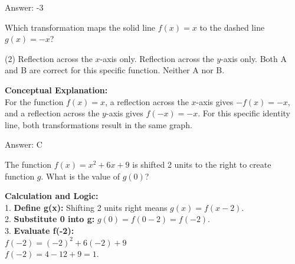 \documentclass[11pt,paper=a4,answers]{exam}
\begin{document}
\begin{questions}
\begin{solution}
\vspace{25pt}

Answer: \colorbox{yellow!100}{-3}
\end{solution}

\vspace{40pt}

\question
\begin{center}
\end{center}
Which transformation maps the solid line $f(x) = x$ to the dashed line $g(x) = -x$?
\begin{tasks}(2)
    \task Reflection across the $x$-axis only.
    \task Reflection across the $y$-axis only.
    \task Both A and B are correct for this specific function.
    \task Neither A nor B.
\end{tasks}

\begin{solution}
\textbf{Conceptual Explanation:} \\
For the function $f(x) = x$, a reflection across the $x$-axis gives $-f(x) = -x$, and a reflection across the $y$-axis gives $f(-x) = -x$. For this specific identity line, both transformations result in the same graph.

\vspace{25pt}

Answer: \colorbox{yellow!100}{C}
\end{solution}

\vspace{40pt}

\question
The function $f(x) = x^2 + 6x + 9$ is shifted 2 units to the right to create function $g$. What is the value of $g(0)$?

\begin{solution}
\textbf{Calculation and Logic:} \\
1. \textbf{Define g(x):} Shifting 2 units right means $g(x) = f(x-2)$. \\
2. \textbf{Substitute 0 into g:} $g(0) = f(0-2) = f(-2)$. \\
3. \textbf{Evaluate f(-2):} \\
$f(-2) = (-2)^2 + 6(-2) + 9$ \\
$f(-2) = 4 - 12 + 9 = 1$.


\end{solution}
\end{questions}
\end{document}
